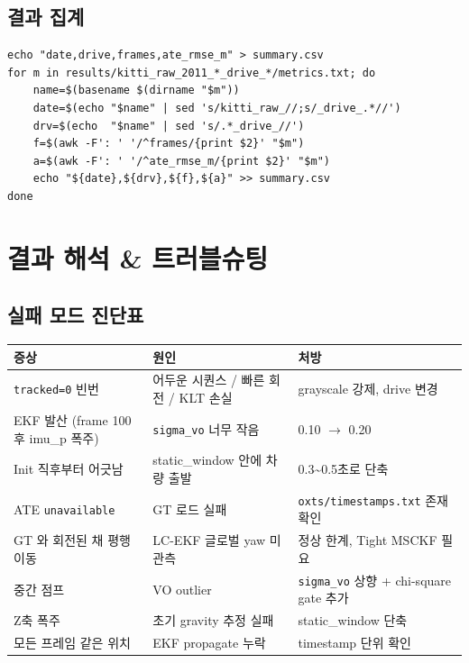 \documentclass[11pt,a4paper,oneside]{report}
\begin{document}
\section{결과 집계}

\begin{lstlisting}[style=shell]
echo "date,drive,frames,ate_rmse_m" > summary.csv
for m in results/kitti_raw_2011_*_drive_*/metrics.txt; do
    name=$(basename $(dirname "$m"))
    date=$(echo "$name" | sed 's/kitti_raw_//;s/_drive_.*//')
    drv=$(echo  "$name" | sed 's/.*_drive_//')
    f=$(awk -F': ' '/^frames/{print $2}' "$m")
    a=$(awk -F': ' '/^ate_rmse_m/{print $2}' "$m")
    echo "${date},${drv},${f},${a}" >> summary.csv
done
\end{lstlisting}


\chapter{결과 해석 \& 트러블슈팅}

\section{실패 모드 진단표}

\begin{center}\small
\begin{tabular}{p{}p{}p{}}
\toprule
증상 & 원인 & 처방 \\
\midrule
\texttt{tracked=0} 빈번 & 어두운 시퀀스 / 빠른 회전 / KLT 손실 & grayscale 강제, drive 변경 \\
EKF 발산 (frame 100 후 imu\_p 폭주) & \texttt{sigma\_vo} 너무 작음 & 0.10 \(\to\) 0.20 \\
Init 직후부터 어긋남 & static\_window 안에 차량 출발 & 0.3\textasciitilde{}0.5초로 단축 \\
ATE \texttt{unavailable} & GT 로드 실패 & \texttt{oxts/timestamps.txt} 존재 확인 \\
GT 와 회전된 채 평행이동 & LC-EKF 글로벌 yaw 미관측 & 정상 한계, Tight MSCKF 필요 \\
중간 점프 & VO outlier & \texttt{sigma\_vo} 상향 + chi-square gate 추가 \\
Z축 폭주 & 초기 gravity 추정 실패 & static\_window 단축 \\
모든 프레임 같은 위치 & EKF propagate 누락 & timestamp 단위 확인 \\
\bottomrule
\end{tabular}
\end{center}
\end{document}
